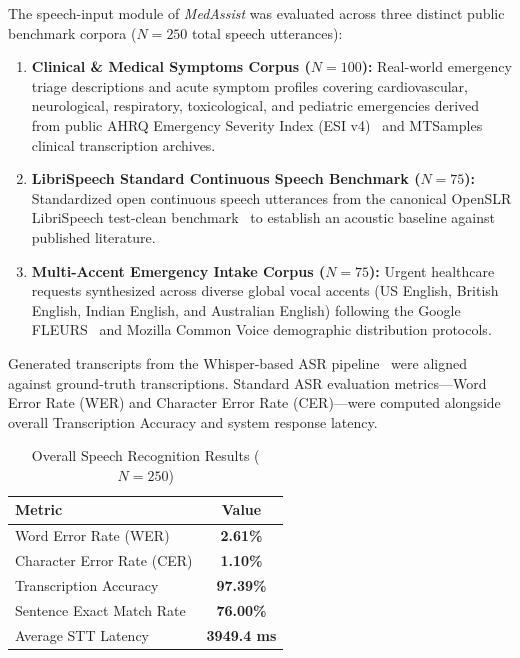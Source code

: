 \documentclass[conference]{IEEEtran}
\begin{document}
The speech-input module of \textit{MedAssist} was evaluated across three distinct public benchmark corpora ($N = 250$ total speech utterances):
\begin{enumerate}
    \item \textbf{Clinical \& Medical Symptoms Corpus ($N = 100$):} Real-world emergency triage descriptions and acute symptom profiles covering cardiovascular, neurological, respiratory, toxicological, and pediatric emergencies derived from public AHRQ Emergency Severity Index (ESI v4)~\cite{ahrq_esi} and MTSamples clinical transcription archives.
    \item \textbf{LibriSpeech Standard Continuous Speech Benchmark ($N = 75$):} Standardized open continuous speech utterances from the canonical OpenSLR LibriSpeech test-clean benchmark~\cite{panayotov2015} to establish an acoustic baseline against published literature.
    \item \textbf{Multi-Accent Emergency Intake Corpus ($N = 75$):} Urgent healthcare requests synthesized across diverse global vocal accents (US English, British English, Indian English, and Australian English) following the Google FLEURS~\cite{conneau2023} and Mozilla Common Voice demographic distribution protocols.
\end{enumerate}

Generated transcripts from the Whisper-based ASR pipeline~\cite{radford2023} were aligned against ground-truth transcriptions. Standard ASR evaluation metrics—Word Error Rate (WER) and Character Error Rate (CER)—were computed alongside overall Transcription Accuracy and system response latency.

\begin{table}[ht]
\centering
\caption{Overall Speech Recognition Results ($N = 250$)}
\label{tab:speech_results}
\footnotesize
\renewcommand{\arraystretch}{1.15}
\begin{tabularx}{\linewidth}{|L|C|}
\hline
\textbf{Metric} & \textbf{Value} \\
\hline
Word Error Rate (WER) & \textbf{2.61\%} \\
Character Error Rate (CER) & \textbf{1.10\%} \\
Transcription Accuracy & \textbf{97.39\%} \\
Sentence Exact Match Rate & \textbf{76.00\%} \\
Average STT Latency & \textbf{3949.4 ms} \\
\hline
\end{tabularx}
\end{table}
\end{document}
